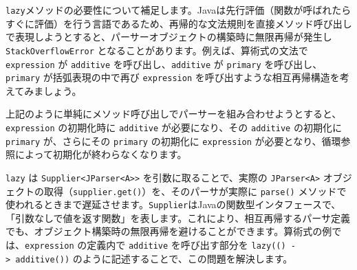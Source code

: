 \texttt{lazy}メソッドの必要性について補足します。Javaは先行評価（関数が呼ばれたらすぐに評価）を行う言語であるため、再帰的な文法規則を直接メソッド呼び出しで表現しようとすると、パーサーオブジェクトの構築時に無限再帰が発生し
\texttt{StackOverflowError} となることがあります。例えば、算術式の文法で
\texttt{expression} が \texttt{additive} を呼び出し、\texttt{additive}
が \texttt{primary} を呼び出し、\texttt{primary} が括弧表現の中で再び
\texttt{expression} を呼び出すような相互再帰構造を考えてみましょう。

\begin{Shaded}
\begin{Highlighting}[]
 \NormalTok{\textgreater{} }\NormalTok{() \{}
     \NormalTok{(); }
\NormalTok{\}}
 \NormalTok{\textgreater{} }\NormalTok{() \{}
     \NormalTok{();   }
\NormalTok{\}}
 \NormalTok{\textgreater{} }\NormalTok{() \{}
     \NormalTok{(}
        \NormalTok{(}\NormalTok{(}\NormalTok{), }\NormalTok{(), }\NormalTok{(}\NormalTok{))}
\NormalTok{    );}
\NormalTok{\}}
\end{Highlighting}
\end{Shaded}

上記のように単純にメソッド呼び出しでパーサーを組み合わせようとすると、\texttt{expression}
の初期化時に \texttt{additive} が必要になり、その \texttt{additive}
の初期化に \texttt{primary} が、さらにその \texttt{primary} の初期化に
\texttt{expression}
が必要となり、循環参照によって初期化が終わらなくなります。

\texttt{lazy} は
\texttt{Supplier\textless{}JParser\textless{}A\textgreater{}\textgreater{}}
を引数に取ることで、実際の \texttt{JParser\textless{}A\textgreater{}}
オブジェクトの取得（\texttt{supplier.get()}）を、そのパーサが実際に
\texttt{parse()}
メソッドで使われるときまで遅延させます。\texttt{Supplier}はJavaの関数型インタフェースで、「引数なしで値を返す関数」を表します。これにより、相互再帰するパーサ定義でも、オブジェクト構築時の無限再帰を避けることができます。算術式の例では、\texttt{expression}
の定義内で \texttt{additive} を呼び出す部分を
\texttt{lazy(()\ -\textgreater{}\ additive())}
のように記述することで、この問題を解決します。


